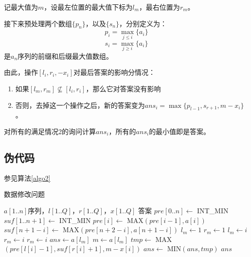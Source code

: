 \documentclass[UTF8]{ctexart}
\begin{document}
        记最大值为$m$，设最左位置的最大值下标为$l_m$，最右位置为$r_m$。

        接下来预处理两个数组$\{p_n\}$，以及$\{s_n\}$，分别定义为：
        $$p_i = \max_{j \leq i}{\{a_i\}}$$
        $$s_i = \max_{j \geq i}{\{a_i\}}$$
        是$a_n$序列的前缀和后缀最大值数组。

        由此，操作$[l_i, r_i, -x_i]$对最后答案的影响分情况：
        \begin{enumerate}
            \item 如果$[l_m, r_m]\nsubseteq [l_i, r_i]$，那么它对答案没有影响
            \item 否则，去掉这一个操作之后，新的答案变为$ans_i=\max{\{p_{l-1}, s_{r+1}, m-x_i\}}$。
        \end{enumerate}
        对所有的满足情况2的询问计算$ans_i$，所有的$ans_i$的最小值即是答案。

    \subsection*{伪代码}
    参见算法\ref{algo2}
    \begin{algorithm}
        \caption{数据修改问题}
        \begin{algorithmic}[1]
            \Require $a[1..n]$序列，$l[1..Q]$，$r[1..Q]$，$x[1..Q]$
            \Ensure 答案
                \State $pre[0..n] \gets$ INT_MIN
                \State $suf[1..n+1] \gets$ INT_MIN
                    \State $pre[i] \gets$ MAX$(pre[i-1], a[i])$
                    \State $suf[n+1-i] \gets$ MAX$(pre[n+2-i], a[n+1-i])$
                \EndFor
                \State $l_m \gets 1$ 
                \State $r_m \gets 1$
                        \State $l_m \gets i$
                        \State $r_m \gets i$
                        \State $r_m \gets i$
                    \EndIf
                \EndFor
                \State $ans \gets a[l_m]$
                \State $m \gets a[l_m]$
                        $tmp \gets$ MAX$(pre[l[i]-1], suf[r[i]+1], m-x[i])$
                        $ans \gets$ MIN$(ans, tmp)$
                    \EndIf
                \EndFor
                \State \Return $ans$
                
            \EndFunction
    
        \end{algorithmic}
        \label{algo2}
    \end{algorithm}
\end{document}
